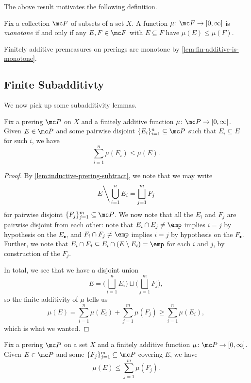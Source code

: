 \documentclass[../notes.tex]{subfiles}
\begin{document}
The above result motivates the following definition.
\begin{definition}[Monotone]
	Fix a collection $\mc F$ of subsets of a set $X$. A function $\mu\colon\mc F\to[0,\infty]$ is \textit{monotone} if and only if any $E,F\in\mc F$ with $E\subseteq F$ have $\mu(E)\le\mu(F)$.
\end{definition}
\begin{example}
	Finitely additive premeasures on prerings are monotone by \autoref{lem:fin-additive-is-monotone}.
\end{example}

\subsection{Finite Subadditivty}
We now pick up some subadditivity lemmas.
\begin{lemma} \label{lem:almost-subadditive}
	Fix a prering $\mc P$ on $X$ and a finitely additive function $\mu\colon\mc P\to[0,\infty]$. Given $E\in\mc P$ and some pairwise disjoint $\{E_i\}_{i=1}^n\subseteq\mc P$ such that $E_i\subseteq E$ for such $i$, we have
	\[\sum_{i=1}^n\mu(E_i)\le\mu(E).\]
\end{lemma}
\begin{proof}
	By \autoref{lem:inductive-prering-subtract}, we note that we may write
	\[E{\mathbin\bigg\backslash}\bigcup_{i=1}^nE_i=\bigsqcup_{j=1}^mF_j\]
	for pairwise disjoint $\{F_j\}_{j=1}^m\subseteq\mc P$. We now note that all the $E_i$ and $F_j$ are pairwise disjoint from each other: note that $E_i\cap E_j\ne\emp$ implies $i=j$ by hypothesis on the $E_\bullet$, and $F_i\cap F_j\ne\emp$ implies $i=j$ by hypothesis on the $F_\bullet$. Further, we note that $E_i\cap F_j\subseteq E_i\cap(E\setminus E_i)=\emp$ for each $i$ and $j$, by construction of the $F_j$.

	In total, we see that we have a disjoint union
	\[E=\Bigg(\bigsqcup_{i=1}^nE_i\Bigg)\sqcup\Bigg(\bigsqcup_{j=1}^mF_j\Bigg),\]
	so the finite additivity of $\mu$ tells us
	\[\mu(E)=\sum_{i=1}^n\mu(E_i)+\sum_{j=1}^m\mu(F_j)\ge\sum_{i=1}^n\mu(E_i),\]
	which is what we wanted.
\end{proof}
\begin{lemma} \label{lem:finitely-additive-is-subaddtive}
	Fix a prering $\mc P$ on a set $X$ and a finitely additive function $\mu\colon\mc P\to[0,\infty]$. Given $E\in\mc P$ and some $\{F_j\}_{j=1}^m\subseteq\mc P$ covering $E$, we have
	\[\mu(E)\le\sum_{j=1}^m\mu(F_j).\]
\end{lemma}
\end{document}

